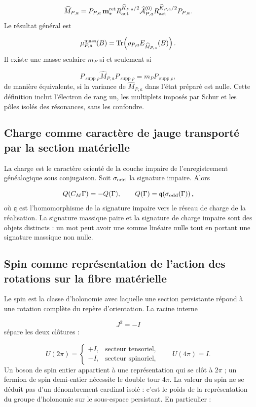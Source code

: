 \[
 \widehat M_{P,a}
 =P_{P,a}\,
 \mathbf m_\star^{\rm ret}
 R_{\rm act}^{\widehat K_{P,a}/2}
 \widehat{\mathcal A}_{P,a}^{(0)}
 R_{\rm act}^{\widehat K_{P,a}/2}
 P_{P,a}.
\]
Le résultat général est

\[
 \mu_{P,a}^{\rm mass}(B)
 =\operatorname{Tr}\!\left(
 \rho_{P,a}E_{\widehat M_{P,a}}(B)\right).
\]
Il existe une masse scalaire \(m_P\) si et seulement si

\[
 P_{\operatorname{supp}\rho}\widehat M_{P,a}
 P_{\operatorname{supp}\rho}
 =m_P P_{\operatorname{supp}\rho},
\]
de manière équivalente, si la variance de \(\widehat M_{P,a}\) dans l'état préparé est nulle. Cette définition inclut l'électron de rang un, les multiplets imposés par Schur et les pôles isolés des résonances, sans les confondre.

\subsection{Charge comme caractère de jauge transporté par la section matérielle}
La charge est le caractère orienté de la couche impaire de l'enregistrement généalogique sous conjugaison. Soit \(\sigma_{\rm odd}\) la signature impaire. Alors

\[
 Q(C_M\Gamma)=-Q(\Gamma),\qquad
 Q(\Gamma)=\mathfrak q\!\left(\sigma_{\rm odd}(\Gamma)\right),
\]
où \(\mathfrak q\) est l'homomorphisme de la signature impaire vers le réseau de charge de la réalisation. La signature massique paire et la signature de charge impaire sont des objets distincts : un mot peut avoir une somme linéaire nulle tout en portant une signature massique non nulle.

\subsection{Spin comme représentation de l'action des rotations sur la fibre matérielle}
Le spin est la classe d'holonomie avec laquelle une section persistante répond à une rotation complète du repère d'orientation. La racine interne

\[
 J^2=-I
\]
sépare les deux clôtures :

\[
 U(2\pi)=
 \begin{cases}
 +I,&\text{secteur tensoriel},\\
 -I,&\text{secteur spinoriel},
 \end{cases}
 \qquad
 U(4\pi)=I.
\]
Un boson de spin entier appartient à une représentation qui se clôt à \(2\pi\) ; un fermion de spin demi-entier nécessite le double tour \(4\pi\). La valeur du spin ne se déduit pas d'un dénombrement cardinal isolé : c'est le poids de la représentation du groupe d'holonomie sur le sous-espace persistant. En particulier :

